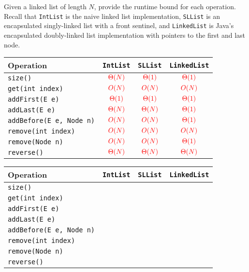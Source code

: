 \question Given a linked list of length $N$, provide the runtime bound for each operation. Recall that \texttt{IntList} is the naive linked list implementation, \texttt{SLList} is an encapsulated singly-linked list with a front sentinel, and \texttt{LinkedList} is Java's encapsulated doubly-linked list implementation with pointers to the first and last node.

\ifprintanswers
{
\renewcommand{\arraystretch}{2}
\setlength{\tabcolsep}{16pt}
\begin{tabularx}{\textwidth}{Xccc}
Operation                       & \texttt{IntList}       & \texttt{SLList}        & \texttt{LinkedList}    \\\hline
\texttt{size()}                 & $\color{red}\Theta(N)$ & $\color{red}\Theta(1)$ & $\color{red}\Theta(1)$ \\
\texttt{get(int index)}         & $\color{red}O(N)$      & $\color{red}O(N)$      & $\color{red}O(N)$      \\
\texttt{addFirst(E e)}          & $\color{red}\Theta(1)$ & $\color{red}\Theta(1)$ & $\color{red}\Theta(1)$ \\
\texttt{addLast(E e)}           & $\color{red}\Theta(N)$ & $\color{red}\Theta(N)$ & $\color{red}\Theta(1)$ \\
\texttt{addBefore(E e, Node n)} & $\color{red}O(N)$      & $\color{red}O(N)$      & $\color{red}\Theta(1)$ \\
\texttt{remove(int index)}      & $\color{red}O(N)$      & $\color{red}O(N)$      & $\color{red}O(N)$      \\
\texttt{remove(Node n)}         & $\color{red}O(N)$      & $\color{red}O(N)$      & $\color{red}\Theta(1)$ \\
\texttt{reverse()}              & $\color{red}\Theta(N)$ & $\color{red}\Theta(N)$ & $\color{red}\Theta(N)$ \\
\end{tabularx}
\else
\begin{tabularx}{\textwidth}{Xccc}
Operation                       & \texttt{IntList} & \texttt{SLList} & \texttt{LinkedList} \\ \hline
\texttt{size()}                 &                  &                 &                     \\
\texttt{get(int index)}         &                  &                 &                     \\
\texttt{addFirst(E e)}          &                  &                 &                     \\
\texttt{addLast(E e)}           &                  &                 &                     \\
\texttt{addBefore(E e, Node n)} &                  &                 &                     \\
\texttt{remove(int index)}      &                  &                 &                     \\
\texttt{remove(Node n)}         &                  &                 &                     \\
\texttt{reverse()}              &                  &                 &                     \\
\end{tabularx}
}
\fi

